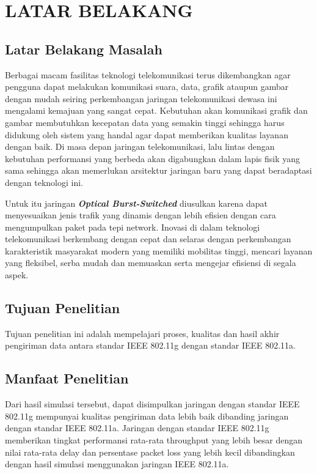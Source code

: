 \documentclass{jtetiproposalskripsi}
\begin{document}
\chapter{LATAR BELAKANG}

\section{Latar Belakang Masalah}
Berbagai macam fasilitas teknologi telekomunikasi terus dikembangkan agar pengguna dapat melakukan komunikasi suara, data, grafik ataupun gambar dengan mudah seiring perkembangan jaringan telekomunikasi dewasa ini mengalami kemajuan yang sangat cepat. Kebutuhan akan komunikasi grafik dan gambar membutuhkan kecepatan data yang semakin tinggi sehingga harus didukung oleh sistem yang handal agar dapat memberikan kualitas layanan dengan baik. Di masa depan jaringan telekomunikasi, lalu lintas dengan kebutuhan performansi yang berbeda akan digabungkan dalam lapis fisik yang sama sehingga akan memerlukan arsitektur jaringan baru yang dapat beradaptasi dengan teknologi ini.

Untuk itu jaringan \textit{\textbf{Optical Burst-Switched}} diusulkan karena dapat menyesuaikan jenis trafik yang dinamis dengan lebih efisien dengan cara mengumpulkan paket pada tepi network. Inovasi di dalam teknologi telekomunikasi berkembang dengan cepat dan selaras dengan perkembangan karakteristik masyarakat modern yang memiliki mobilitas tinggi, mencari layanan yang fleksibel, serba mudah dan memuaskan serta mengejar efisiensi di segala aspek.

\section{Tujuan Penelitian}
Tujuan penelitian ini adalah mempelajari proses, kualitas dan hasil akhir pengiriman data antara standar IEEE 802.11g dengan standar IEEE 802.11a.

\section{Manfaat Penelitian}
Dari hasil simulasi tersebut, dapat disimpulkan jaringan dengan standar IEEE 802.11g mempunyai kualitas pengiriman data lebih baik dibanding jaringan dengan standar IEEE 802.11a. Jaringan dengan standar IEEE 802.11g memberikan tingkat performansi rata-rata throughput yang lebih besar dengan nilai rata-rata delay dan persentase packet loss yang lebih kecil dibandingkan dengan hasil simulasi menggunakan jaringan IEEE 802.11a.
\end{document}

